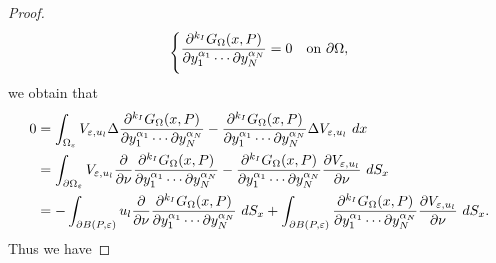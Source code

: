 \documentclass[11pt,reqno]{article}
\numberwithin{equation}{section}
\newcommand\e\varepsilon
\renewcommand\O\Omega
\newcommand{\Ma}{\color{blue}}
\begin{document}
\begin{proof}
\begin{equation*}
\begin{cases}
			\displaystyle \frac{\partial^{{ k_I}}G_{\Omega}(x,P)}{\partial y_1^{\alpha_1}\cdots\partial y_N^{\alpha_N}} =0 &\text{on }\partial \Omega,\vspace{2mm}\\
		\end{cases}
        \end{equation*}
    we obtain that
    \begin{equation}\label{eq27102025-4}
        \begin{aligned}
            0&=\int_{\O_\e} V_{\e,u_l}\Delta \frac{\partial^{{ k_I}}G_{\Omega}(x,P)}{\partial y_1^{\alpha_1}\cdots\partial y_N^{\alpha_N}}-\frac{\partial^{{ k_I}}G_{\Omega}(x,P)}{\partial y_1^{\alpha_1}\cdots\partial y_N^{\alpha_N}}\Delta V_{\e,u_l}\ dx\vspace{2mm}\\
            &= \int_{\partial \O_\e} V_{\e,u_l}\frac{\partial}{\partial \nu}\frac{\partial^{{ k_I}}G_{\Omega}(x,P)}{\partial y_1^{\alpha_1}\cdots\partial y_N^{\alpha_N}}-\frac{\partial^{{ k_I}}G_{\Omega}(x,P)}{\partial y_1^{\alpha_1}\cdots\partial y_N^{\alpha_N}} \frac{\partial V_{\e,u_l}}{\partial \nu} \ dS_x\vspace{2mm}\\
            &= -\int_{\partial B(P,\e)} u_l\frac{\partial}{\partial \nu}\frac{\partial^{{ k_I}}G_{\Omega}(x,P)}{\partial y_1^{\alpha_1}\cdots\partial y_N^{\alpha_N}}\ dS_x+\int_{\partial B(P,\e)}\frac{\partial^{{ k_I}}G_{\Omega}(x,P)}{\partial y_1^{\alpha_1}\cdots\partial y_N^{\alpha_N}} \frac{\partial V_{\e,u_l}}{\partial \nu} \ dS_x.\vspace{2mm}\\
        \end{aligned}
    \end{equation}
    Thus we have 

\end{proof}
\end{document}
